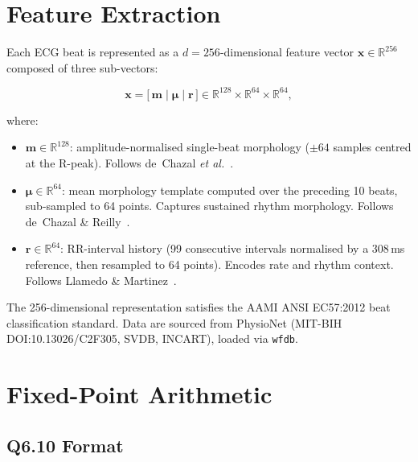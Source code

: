 \documentclass[11pt]{article}
\newcommand{\R}{\mathbb{R}}
\begin{document}
\section{Feature Extraction}

Each ECG beat is represented as a $d=256$-dimensional feature vector
$\mathbf{x} \in \R^{256}$ composed of three sub-vectors:

\begin{equation}
  \mathbf{x} = \bigl[\,\mathbf{m}\;\big|\;\boldsymbol{\mu}\;\big|\;\mathbf{r}\,\bigr]
  \in \R^{128} \times \R^{64} \times \R^{64},
  \label{eq:feature}
\end{equation}

\noindent where:
\begin{itemize}[noitemsep]
  \item $\mathbf{m} \in \R^{128}$: amplitude-normalised single-beat morphology ($\pm 64$ samples centred at the R-peak).  Follows de~Chazal \emph{et al.}~\cite{dechazal2004}.
  \item $\boldsymbol{\mu} \in \R^{64}$: mean morphology template computed over the preceding 10 beats, sub-sampled to 64 points.  Captures sustained rhythm morphology.  Follows de~Chazal \& Reilly~\cite{dechazal2006}.
  \item $\mathbf{r} \in \R^{64}$: RR-interval history (99 consecutive intervals normalised by a 308\,ms reference, then resampled to 64 points).  Encodes rate and rhythm context.  Follows Llamedo \& Martinez~\cite{llamedo2011}.
\end{itemize}

The 256-dimensional representation satisfies the AAMI ANSI EC57:2012 beat
classification standard.  Data are sourced from PhysioNet (MIT-BIH
DOI:10.13026/C2F305, SVDB, INCART), loaded via \texttt{wfdb}.

\section{Fixed-Point Arithmetic}

\subsection{Q6.10 Format}
\end{document}
